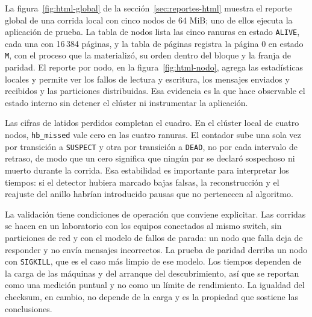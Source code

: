 La figura~\ref{fig:html-global} de la sección~\ref{sec:reportes-html} muestra el reporte global de una corrida local con cinco nodos de 64 MiB; uno de ellos ejecuta la aplicación de prueba. La tabla de nodos lista las cinco ranuras en estado \texttt{ALIVE}, cada una con 16\,384 páginas, y la tabla de páginas registra la página 0 en estado \texttt{M}, con el proceso que la materializó, su orden dentro del bloque y la franja de paridad. El reporte por nodo, en la figura~\ref{fig:html-nodo}, agrega las estadísticas locales y permite ver los fallos de lectura y escritura, los mensajes enviados y recibidos y las particiones distribuidas. Esa evidencia es la que hace observable el estado interno sin detener el clúster ni instrumentar la aplicación.

Las cifras de latidos perdidos completan el cuadro. En el clúster local de cuatro nodos, \texttt{hb\_missed} vale cero en las cuatro ranuras. El contador sube una sola vez por transición a \texttt{SUSPECT} y otra por transición a \texttt{DEAD}, no por cada intervalo de retraso, de modo que un cero significa que ningún par se declaró sospechoso ni muerto durante la corrida. Esa estabilidad es importante para interpretar los tiempos: si el detector hubiera marcado bajas falsas, la reconstrucción y el reajuste del anillo habrían introducido pausas que no pertenecen al algoritmo.

La validación tiene condiciones de operación que conviene explicitar. Las corridas se hacen en un laboratorio con los equipos conectados al mismo switch, sin particiones de red y con el modelo de fallos de parada: un nodo que falla deja de responder y no envía mensajes incorrectos. La prueba de paridad derriba un nodo con \texttt{SIGKILL}, que es el caso más limpio de ese modelo. Los tiempos dependen de la carga de las máquinas y del arranque del descubrimiento, así que se reportan como una medición puntual y no como un límite de rendimiento. La igualdad del checksum, en cambio, no depende de la carga y es la propiedad que sostiene las conclusiones.
